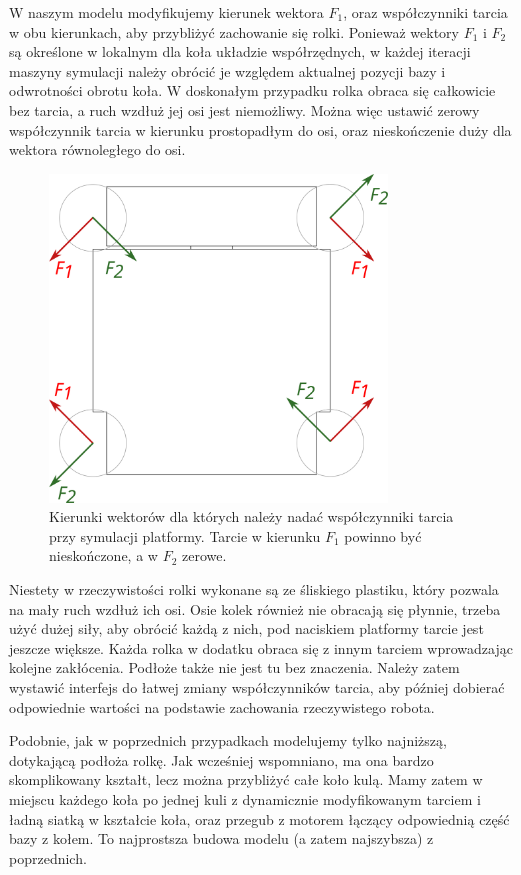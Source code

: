 		W naszym modelu modyfikujemy kierunek wektora $F_1$, oraz współczynniki tarcia w obu kierunkach, aby przybliżyć zachowanie się rolki.
		Ponieważ wektory $F_1$ i $F_2$ są określone w lokalnym dla koła układzie współrzędnych, 
		w każdej iteracji maszyny symulacji należy obrócić je względem aktualnej pozycji bazy i odwrotności obrotu koła.
		W doskonałym przypadku rolka obraca się całkowicie bez tarcia, a ruch wzdłuż jej osi jest niemożliwy.
		Można więc ustawić zerowy współczynnik tarcia w kierunku prostopadłym do osi, oraz nieskończenie duży dla wektora równoległego do osi.

		\begin{figure}[H]
		\centering
		\includegraphics[width=0.8\textwidth]{graphics/base_vects.pdf}
		\caption{Kierunki wektorów dla których należy nadać współczynniki tarcia przy symulacji platformy. Tarcie w kierunku $F_1$ powinno być nieskończone, a w $F_2$ zerowe.}
		\end{figure} 

		Niestety w rzeczywistości rolki wykonane są ze śliskiego plastiku, który pozwala na mały ruch wzdłuż ich osi.
		Osie kolek również nie obracają się płynnie, trzeba użyć dużej siły, aby obrócić każdą z nich, pod naciskiem platformy tarcie jest jeszcze większe.
		Każda rolka w dodatku obraca się z innym tarciem wprowadzając kolejne zakłócenia.
		Podłoże także nie jest tu bez znaczenia.
		Należy zatem wystawić interfejs do łatwej zmiany współczynników tarcia, aby później dobierać odpowiednie wartości na podstawie zachowania rzeczywistego robota.

		Podobnie, jak w poprzednich przypadkach modelujemy tylko najniższą, dotykającą podłoża rolkę.
		Jak wcześniej wspomniano, ma ona bardzo skomplikowany kształt, lecz można przybliżyć całe koło kulą.
		Mamy zatem w miejscu każdego koła po jednej kuli z dynamicznie modyfikowanym tarciem i ładną siatką w kształcie koła, oraz przegub z motorem łączący odpowiednią część bazy z kołem.
		To najprostsza budowa modelu (a zatem najszybsza) z poprzednich.

